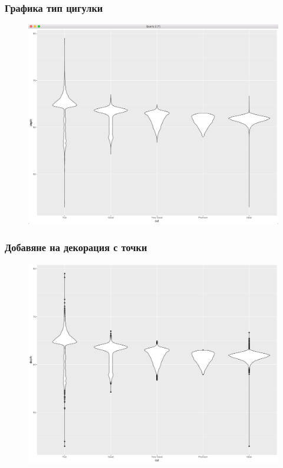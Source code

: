 \documentclass{beamer}
\begin{document}
\begin{frame}
\frametitle{Графика тип цигулки}
\begin{figure}[]\includegraphics[width=\textwidth,height=0.75\textheight]{pic0039}\end{figure}
\end{frame}

\begin{frame}
\frametitle{Добавяне на декорация с точки}
\begin{figure}[]\includegraphics[width=\textwidth,height=0.75\textheight]{pic0040}\end{figure}
\end{frame}
\end{document}
